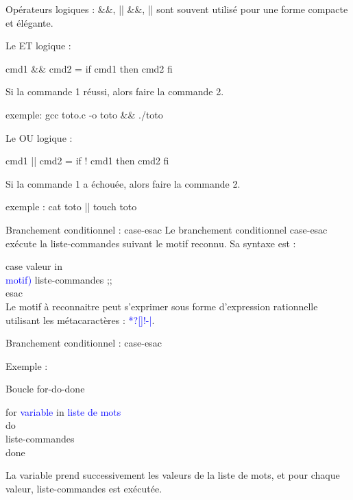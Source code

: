 \documentclass[10pt]{beamer}
\newcommand{\param}[1]{\textcolor{blue}{#1}}
\begin{document}
\begin{frame}[fragile]{Opérateurs logiques : \&\&, ||}
\&\&, || sont souvent utilisé pour une forme compacte et élégante.
\pause

Le ET logique :

\begin{center}
cmd1 \&\& cmd2 = if cmd1 then cmd2 fi
\end{center}
Si la commande 1 réussi, alors faire la commande 2.

\pause
exemple: gcc toto.c -o toto \&\& ./toto

\pause
Le OU logique :
\begin{center}
cmd1 || cmd2 = if ! cmd1 then cmd2 fi
\end{center}
Si la commande 1 a échouée, alors faire la commande 2.

exemple : cat toto || touch toto
\end{frame}

\begin{frame}[fragile]{Branchement conditionnel : case-esac}
Le branchement conditionnel \alert{case-esac} exécute la liste-commandes suivant le motif reconnu. Sa syntaxe est :

\alert{case} valeur \alert{in} \\
\param{motif)} liste-commandes ;; \\
\alert{esac} \\

Le motif à reconnaitre peut s’exprimer sous forme d’expression rationnelle utilisant les métacaractères : \param{*?[]!-|}.
\end{frame}

\begin{frame}[fragile]{Branchement conditionnel : case-esac}

Exemple :

\end{frame}

\begin{frame}{Boucle for-do-done}

\alert{for} \param{variable} \alert{in} \param{liste de mots}\\
\alert{do}\\
liste-commandes \\
\alert{done}

La variable prend successivement les valeurs de la liste de mots, et
pour chaque valeur, liste-commandes est exécutée.

\end{frame}
\end{document}
